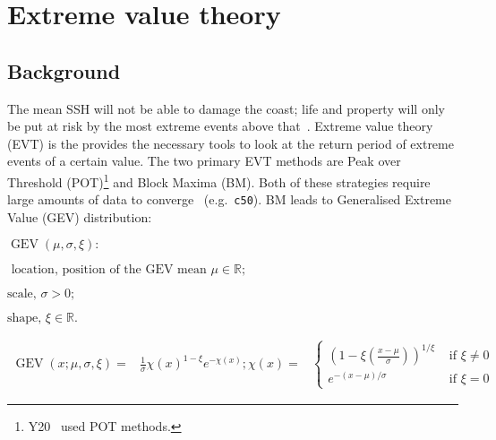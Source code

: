 \newpage
\newpage
[.]
\pagebreak

\section{Extreme value theory}
\label{sec:evt}
\subsection{Background}
The mean SSH will
not be able to damage the coast; life and property will only be put
at risk by the most extreme events above that~\cite{taleb2019statistical, Taleb2012AntifragileH}.
Extreme value theory (EVT) is the provides the necessary tools
to look at the return period of extreme events of a certain value.
The two primary EVT methods are Peak over Threshold (POT)\footnote{Y20~\cite{ZannaPreprint} used POT methods. } and Block Maxima (BM).
Both of these strategies require
large amounts of data to converge~\cite{taleb2019much} (e.g.~\texttt{c50}).
BM leads to Generalised Extreme Value (GEV) distribution:


    \(
    \operatorname{GEV}(\mu, \sigma, \xi):
    \)

    \(
    \text{ location, position of the GEV mean } \mu \in \mathbb{R};
    \)

    \(
    \text{scale, } \sigma>0;
    \)

    \(
    \text{shape, } \xi \in \mathbb{R}.
    \)

    \iffalse
    \begin{align}
        \chi(x)=&\{
               \begin{array}{ll}
                    \left(1- \xi\left(\frac{x-
                    \mu}{\sigma} \right)\right)^{\frac{1}{\xi}} &
                     \text { if } \xi \neq 0 \\
                    e^{-\frac{x-\mu}{\sigma}} &
                    \text { if } \xi=0 \\

              \end{array}.
    \tag{GEV-2} \label{eq:GEV-2}

    \end{align}
    \fi

\begin{align}
    \operatorname{GEV}(x; \mu, \sigma, \xi)=&
    \frac{1}{\sigma} \chi(x)^{1-\xi} e^{-\chi(x)}; \tag{GEV-1}
    \label{eq:GEV-1}
    \chi(x)=&\left\{\begin{array}{ll}
    \left(1-\xi\left(\frac{x-\mu}{\sigma}\right)\right)^{1 / \xi} & \text { if } \xi \neq 0 \\
    e^{-(x-\mu) / \sigma} & \text { if } \xi=0 \tag{GEV-2}
    \end{array}\right.
   \label{eq:GEV-2}
\end{align}


